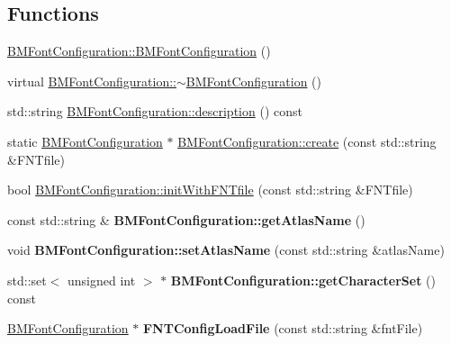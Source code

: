 \subsection*{Functions}
\begin{DoxyCompactItemize}
\item 
\hyperlink{group__label_ga04b6c1a932298f09e2271950f2da6661}{B\+M\+Font\+Configuration\+::\+B\+M\+Font\+Configuration} ()
\item 
virtual \hyperlink{group__label_gad54c7b6ca83e8eaaedfff5ec431b8b11}{B\+M\+Font\+Configuration\+::$\sim$\+B\+M\+Font\+Configuration} ()
\item 
std\+::string \hyperlink{group__label_gab5b833ca803bff72c9ab19abf55eb8ac}{B\+M\+Font\+Configuration\+::description} () const
\item 
static \hyperlink{classBMFontConfiguration}{B\+M\+Font\+Configuration} $\ast$ \hyperlink{group__label_gaf6f6e33acf57e6fdf10de805002f21c6}{B\+M\+Font\+Configuration\+::create} (const std\+::string \&F\+N\+Tfile)
\item 
bool \hyperlink{group__label_ga0eb7f4ea5cc521e1502006c04cc67733}{B\+M\+Font\+Configuration\+::init\+With\+F\+N\+Tfile} (const std\+::string \&F\+N\+Tfile)
\item 
\mbox{\label{group__label_gad274de0ea6ede4d07c4a65f03bc4cb25}} 
const std\+::string \& {\bfseries B\+M\+Font\+Configuration\+::get\+Atlas\+Name} ()
\item 
\mbox{\label{group__label_ga871cdaaac71c43fa35a62fe9f0c3d3cc}} 
void {\bfseries B\+M\+Font\+Configuration\+::set\+Atlas\+Name} (const std\+::string \&atlas\+Name)
\item 
\mbox{\label{group__label_ga039fbd9a15e5e226af6e1dba80108bcf}} 
std\+::set$<$ unsigned int $>$ $\ast$ {\bfseries B\+M\+Font\+Configuration\+::get\+Character\+Set} () const
\item 
\mbox{\label{group__label_ga4370ebb6f56fe325b1be4ec3426fdca7}} 
\hyperlink{classBMFontConfiguration}{B\+M\+Font\+Configuration} $\ast$ {\bfseries F\+N\+T\+Config\+Load\+File} (const std\+::string \&fnt\+File)
\end{DoxyCompactItemize}
